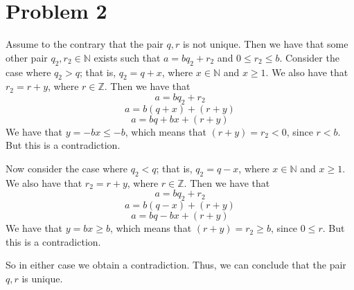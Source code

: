 \documentclass{article}
\begin{document}
\section*{Problem 2}
Assume to the contrary that the pair $q,r$ is not unique. Then we have that
some other pair $q_2, r_2 \in \mathbb{N}$ exists such that $a = bq_2 + r_2$
and $0 \leq r_2 \leq b$. Consider the case where $q_2 > q$; that is, $q_2 = q + x$,
where $x \in \mathbb{N}$ and $x \geq 1$. We also have that $r_2 = r + y$,
where $r \in \mathbb{Z}$. Then we have that
\[ a = bq_2 + r_2 \]
\[ a = b(q + x) + (r + y) \]
\[ a = bq + bx + (r + y) \]
We have that $y = -bx \leq -b$, which means that $(r + y) = r_2 < 0$, since $r < b$.
But this is a contradiction.

Now consider the case where $q_2 < q$; that is, $q_2 = q - x$, where $x \in \mathbb{N}$
and $x \geq 1$. We also have that $r_2 = r + y$, where $r \in \mathbb{Z}$. Then
we have that
\[ a = bq_2 + r_2 \]
\[ a = b(q - x) + (r + y) \]
\[ a = bq - bx + (r + y) \]
We have that $y = bx \geq b$, which means that $(r + y) = r_2 \geq b$, since
$0 \leq r$. But this is a contradiction.

So in either case we obtain a contradiction. Thus, we can conclude that the pair
$q,r$ is unique.
\end{document}
